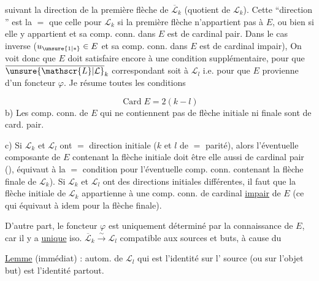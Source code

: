 suivant la direction de la première flèche de
$\overline{\mathscr{L}}_k$ (quotient de $\mathscr{L}_k$).
Cette ``direction '' est la $=$ que celle pour $\mathscr{L}_k$ si
la première flèche  n'appartient pas à $E$, ou bien
si  elle y appartient et sa comp. conn.
dans $E$ est de cardinal pair. Dans le cas
inverse ($u_{\unsure{1|*}}\in E$ et sa comp. conn. dans $E$ est de
cardinal impair),  
On voit donc que $E$ doit satisfaire encore à une
condition supplémentaire, pour que  $\overline{\unsure{\mathscr{L}|\mathcal{L}}}_k$ correspondant
soit  à $\mathscr{L}_l$ i.e. pour que $E$ provienne d'un
foncteur $\varphi$. Je résume toutes les conditions

\[
\operatorname{Card}E=2(k-l)\tag*{a)}
\]
b) Les comp. conn. de $E$ qui ne contiennent pas
de flèche initiale ni finale sont de card. pair.

c) Si $\mathscr{L}_k$ et $\mathscr{L}_l$ ont $=$ direction initiale
($k$ et $l$ de $=$ parité), alors l'éventuelle
composante de $E$ contenant la flèche
initiale doit être elle aussi de cardinal pair
(), équivaut à la $=$
condition pour l'éventuelle comp. conn. contenant la flèche finale de $\mathscr{L}_k$). Si $\mathscr{L}_k$ et $\mathscr{L}_l$
ont des directions initiales différentes, il
faut que la flèche initiale de $\mathscr{L}_k$ appartienne
à une comp. conn. de cardinal \uline{impair} de
$E$ (ce qui équivaut à idem pour la flèche
finale).

D'autre part, le foncteur $\varphi$ est uniquement déterminé par
la connaissance de $E$, car  il y a 
\uline{unique} iso. $\overline{\mathscr{L}}_k\xrightarrow{\sim}\mathscr{L}_l$ compatible aux sources et
buts, à cause du

\uline{Lemme} (immédiat) :  autom. de $\mathscr{L}_l$ qui
est l'identité sur l'  source (ou sur l'objet
but) est l'identité partout.

